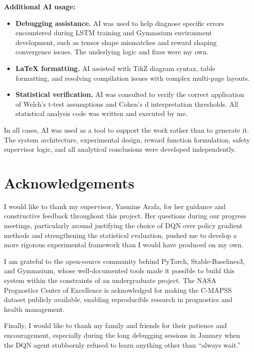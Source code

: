 \documentclass[12pt,a4paper]{report}
\begin{document}
\noindent\textbf{Additional AI usage:}
\begin{itemize}
    \item \textbf{Debugging assistance.} AI was used to help diagnose specific errors encountered during LSTM training and Gymnasium environment development, such as tensor shape mismatches and reward shaping convergence issues. The underlying logic and fixes were my own.
    \item \textbf{LaTeX formatting.} AI assisted with TikZ diagram syntax, table formatting, and resolving compilation issues with complex multi-page layouts.
    \item \textbf{Statistical verification.} AI was consulted to verify the correct application of Welch's t-test assumptions and Cohen's d interpretation thresholds. All statistical analysis code was written and executed by me.
\end{itemize}

\noindent In all cases, AI was used as a tool to support the work rather than to generate it. The system architecture, experimental design, reward function formulation, safety supervisor logic, and all analytical conclusions were developed independently.

\newpage

\chapter*{Acknowledgements}
I would like to thank my supervisor, Yasmine Arafa, for her guidance and constructive feedback throughout this project. Her questions during our progress meetings, particularly around justifying the choice of DQN over policy gradient methods and strengthening the statistical evaluation, pushed me to develop a more rigorous experimental framework than I would have produced on my own.

I am grateful to the open-source community behind PyTorch, Stable-Baselines3, and Gymnasium, whose well-documented tools made it possible to build this system within the constraints of an undergraduate project. The NASA Prognostics Center of Excellence is acknowledged for making the C-MAPSS dataset publicly available, enabling reproducible research in prognostics and health management.

Finally, I would like to thank my family and friends for their patience and encouragement, especially during the long debugging sessions in January when the DQN agent stubbornly refused to learn anything other than ``always wait.''
\end{document}
